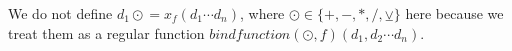 \documentclass{article}
\let\oldsim\sim
\renewcommand{\sim}{{\oldsim}}
\newcommand{\<}{\langle}
\renewcommand{\>}{\rangle}
\newcommand{\RDownarrowp}{{\Downarrow_p^{-1}}}
\newcommand{\RR}{{-1}}
\newcommand{\iif}{{\textbf{if~}}}
\newcommand{\eelse}{{\textbf{~else~}}}
\newcommand{\eend}{{\textbf{~end~}}}
\newcommand{\wwhile}{{\textbf{while~}}}
\newcommand{\ffor}{{\textbf{for~}}}
\newcommand{\bbegin}{{\textbf{begin~}}}
\newcommand{\seq}[3][0.7]{ \begin{minipage}[htpb]{#1\linewidth} \begin{prooftree} \AxiomC{$#2$} \UnaryInfC{$#3$} \end{prooftree} \end{minipage} }
\newcommand{\namedseq}[4][0.7]{ \begin{minipage}[htpb]{#1\linewidth} \begin{prooftree} \AxiomC{$#3$} \LeftLabel{#2} \UnaryInfC{$#4$} \end{prooftree} \end{minipage} }
\theoremstyle{definition}\newtheorem{definition}{\textit{Definition}}
\begin{document}
We do not define $d_1 \mathrel{\odot}= x_f(d_1\cdots d_n)$, where $\odot \in \{+, -, *, /, \veebar\}$ here
because we treat them as a regular function $\mathit{bindfunction}(\odot, f)(d_1, d_2 \cdots d_n)$.


% 
\end{document}

